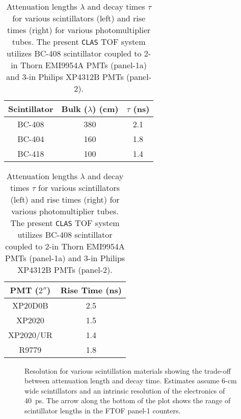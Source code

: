 \begin{table}[htbp]
 \begin{minipage}{1.5cm}
~~
 \end{minipage}
 \begin{minipage}{8.0cm}
   \begin{tabular} {|c|c|c|} \hline
     Scintillator & Bulk ($\lambda$) (cm) & $\tau$ (ns) \\ \hline
     BC-408 & 380 & 2.1 \\
     BC-404 & 160 & 1.8 \\
     BC-418 & 100 & 1.4 \\ \hline
   \end{tabular}
 \end{minipage}
 \begin{minipage}{8.0cm}
   \begin{tabular} {|c|c|} \hline
     PMT ($2''$) & Rise Time (ns) \\ \hline
     XP20D0B   & 2.5 \\
     XP2020    & 1.5 \\
     XP2020/UR & 1.4 \\
     R9779     & 1.8 \\ \hline 
   \end{tabular}
 \end{minipage}
\caption{\small{Attenuation lengths $\lambda$ and decay times $\tau$ for 
various scintillators (left) and rise times (right) for various photomultiplier
tubes.  The present {\tt CLAS} TOF system utilizes BC-408 scintillator coupled 
to 2-in Thorn EMI9954A PMTs (panel-1a) and 3-in Philips XP4312B PMTs
(panel-2).}}
\label{parms}
\end{table}

\begin{figure}[htbp]
\vspace{8.0cm}
\caption{\small{Resolution for various scintillation materials showing the 
trade-off between attenuation length and decay time.  Estimates assume 6-cm 
wide scintillators and an intrinsic resolution of the electronics of 40~ps.
The arrow along the bottom of the plot shows the range of scintillator lengths 
in the FTOF panel-1 counters.}}
\label{sc_tof}
\end{figure}

